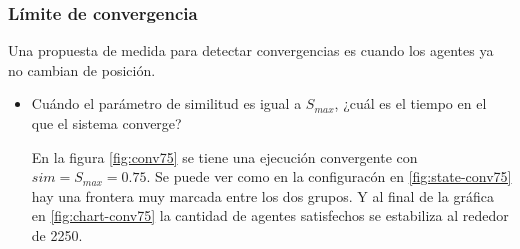 \documentclass{article}
\begin{document}
\subsubsection{Límite de convergencia}

Una propuesta de medida para detectar convergencias es cuando los agentes ya no
cambian de posición.

\begin{itemize}
  \item Cuándo el parámetro de similitud es igual a $S_{max}$, ¿cuál es el
    tiempo en el que el sistema converge?

    En la figura \ref{fig:conv75} se tiene una ejecución convergente con
    $sim = S_{max} = 0.75$. Se puede ver como en la configuracón en
    \ref{fig:state-conv75} hay una frontera muy marcada entre los dos grupos. Y
    al final de la gráfica en \ref{fig:chart-conv75} la cantidad de agentes
    satisfechos se estabiliza al rededor de 2250.


\end{itemize}
\end{document}
